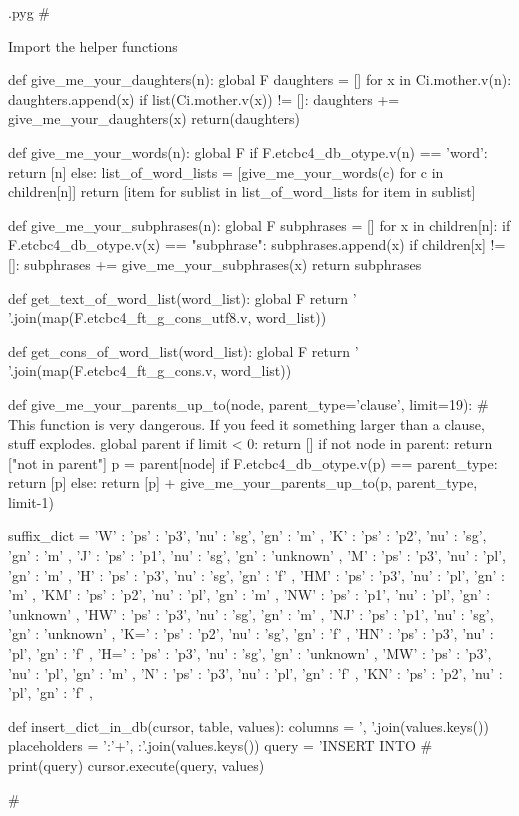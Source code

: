 \documentclass{report}
\makeatletter
\newenvironment{python}{%
  \VerbatimEnvironment
  \minted@resetoptions
  \setkeys{minted@opt}{}
      \begin{VerbatimOut}{\jobname.pyg}}
{%
      \end{VerbatimOut}
      \minted@pygmentize{python}
      \DeleteFile{\jobname.pyg}}
\makeatother
\begin{document}
\begin{python}
#{{{ Import the helper functions

def give_me_your_daughters(n):
        global F
        daughters = []
        for x in Ci.mother.v(n):
            daughters.append(x)
            if list(Ci.mother.v(x)) != []:
                daughters += give_me_your_daughters(x)
        return(daughters)

def give_me_your_words(n):
        global F
        if F.etcbc4_db_otype.v(n) == 'word':
                return [n]
        else:
            list_of_word_lists = [give_me_your_words(c) for c in children[n]]
            return [item for sublist in list_of_word_lists for item in sublist]

def give_me_your_subphrases(n):
        global F
        subphrases = []
        for x in children[n]:
            if F.etcbc4_db_otype.v(x) == "subphrase":
                subphrases.append(x)
            if children[x] != []:
                subphrases += give_me_your_subphrases(x)
        return subphrases

def get_text_of_word_list(word_list):
        global F
        return ' '.join(map(F.etcbc4_ft_g_cons_utf8.v, word_list))

def get_cons_of_word_list(word_list):
        global F
        return ' '.join(map(F.etcbc4_ft_g_cons.v, word_list))

def give_me_your_parents_up_to(node, parent_type='clause', limit=19):
    # This function is very dangerous. If you feed it something larger than a clause, stuff explodes.
        global parent
        if limit < 0:
                return []
        if not node in parent:
                return ["not in parent"]
        p = parent[node]
        if F.etcbc4_db_otype.v(p) == parent_type:
                return [p]
        else:
                return [p] + give_me_your_parents_up_to(p, parent_type, limit-1)

suffix_dict = {
'W'   : { 'ps' : 'p3', 'nu' : 'sg', 'gn' : 'm' },
'K'   : { 'ps' : 'p2', 'nu' : 'sg', 'gn' : 'm' },
'J'   : { 'ps' : 'p1', 'nu' : 'sg', 'gn' : 'unknown' },
'M'   : { 'ps' : 'p3', 'nu' : 'pl', 'gn' : 'm' },
'H'   : { 'ps' : 'p3', 'nu' : 'sg', 'gn' : 'f' },
'HM'  : { 'ps' : 'p3', 'nu' : 'pl', 'gn' : 'm' },
'KM'  : { 'ps' : 'p2', 'nu' : 'pl', 'gn' : 'm' },
'NW'  : { 'ps' : 'p1', 'nu' : 'pl', 'gn' : 'unknown' },
'HW'  : { 'ps' : 'p3', 'nu' : 'sg', 'gn' : 'm' },
'NJ'  : { 'ps' : 'p1', 'nu' : 'sg', 'gn' : 'unknown' },
'K='  : { 'ps' : 'p2', 'nu' : 'sg', 'gn' : 'f' },
'HN'  : { 'ps' : 'p3', 'nu' : 'pl', 'gn' : 'f' },
'H='  : { 'ps' : 'p3', 'nu' : 'sg', 'gn' : 'unknown' },
'MW'  : { 'ps' : 'p3', 'nu' : 'pl', 'gn' : 'm' },
'N'   : { 'ps' : 'p3', 'nu' : 'pl', 'gn' : 'f' },
'KN'  : { 'ps' : 'p2', 'nu' : 'pl', 'gn' : 'f' },
}

def insert_dict_in_db(cursor, table, values):
        columns = ', '.join(values.keys())
        placeholders = ':'+', :'.join(values.keys())
        query = 'INSERT INTO %
#        print(query)
        cursor.execute(query, values)

#}}}
\end{python}
\end{document}
